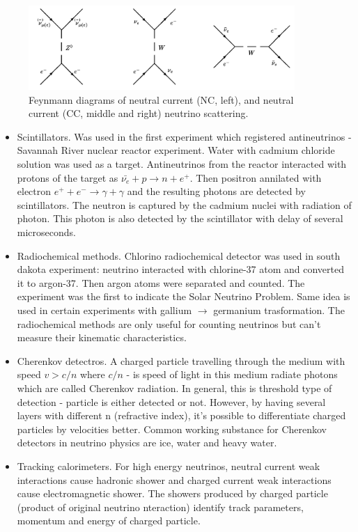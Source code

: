 \begin{figure}
\caption{Feynmann diagrams of neutral current (NC, left), and neutral current (CC, middle and right) neutrino scattering.}
\label{fig:MuonAndNeutronDecays}
\centering
\includegraphics[width=0.9\textwidth, keepaspectratio=true]{figs/neutrinoScattering.png}
\end{figure}
\begin{itemize}

  \item Scintillators. Was used in the first experiment which registered antineutrinos - Savannah River nuclear reactor experiment. Water with cadmium chloride solution was used as a target. Antineutrinos from the reactor interacted with protons of the target as $\bar{\nu_e}+p \rightarrow n+e^+$. Then positron annilated with electron $e^+ + e^- \rightarrow \gamma + \gamma$ and the resulting photons are detected by scintillators. The neutron is captured by the cadmium nuclei with radiation of photon. This photon is also detected by the scintillator with delay of several microseconds. 
  \item Radiochemical methods. Chlorino radiochemical detector was used in south dakota experiment: neutrino interacted with chlorine-37 atom and converted it to argon-37. Then argon atoms were separated and counted. The experiment was the first to indicate the Solar Neutrino Problem. Same idea is used in certain experiments with gallium $\rightarrow$ germanium trasformation. The radiochemical methods are only useful for counting neutrinos but can't measure their kinematic characteristics.
  \item Cherenkov detectros. A charged particle travelling through the medium with speed $v>c/n$ where $c/n$ - is speed of light in this medium radiate photons which are called Cherenkov radiation. In general, this is threshold type of detection - particle is either detected or not. However, by having several layers with different n (refractive index), it's possible to differentiate charged particles by velocities better. Common working substance for Cherenkov detectors in neutrino physics are ice, water and heavy water.
  \item Tracking calorimeters. For high energy neutrinos, neutral current weak interactions cause hadronic shower and charged current weak interactions cause electromagnetic shower. The showers produced by charged particle (product of original neutrino nteraction) identify track parameters, momentum and energy of charged particle.
\end{itemize}


